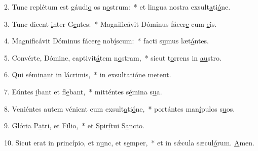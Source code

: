 2. Tunc replétum est gáudi\uline{o} os n\uline{o}strum:~* et lingua nostra exsult\uline{a}ti\uline{ó}ne.\par 
3. Tunc dicent \uline{i}nter G\uline{e}ntes:~* Magnificávit Dóminus fácer\uline{e} cum \uline{e}is.\par 
4. Magnificávit Dóminus fácer\uline{e} nob\uline{í}scum:~* facti s\uline{u}mus læt\uline{á}ntes.\par 
5. Convérte, Dómine, captivit\uline{á}tem n\uline{o}stram,~* sicut t\uline{o}rrens in \uline{au}stro.\par 
6. Qui sémin\uline{a}nt in l\uline{á}crimis,~* in exsultati\uline{ó}ne m\uline{e}tent.\par 
7. Eúntes \uline{i}bant et fl\uline{e}bant,~* mitténtes s\uline{é}mina s\uline{u}a.\par 
8. Veniéntes autem vénient cum exsult\uline{a}ti\uline{ó}ne,~* portántes man\uline{í}pulos s\uline{u}os.\par 
9. Glória P\uline{a}tri, et F\uline{í}lio,~* et Spir\uline{í}tui S\uline{a}ncto.\par 
10. Sicut erat in princípio, et n\uline{u}nc, et s\uline{e}mper,~* et in sǽcula sæcul\uline{ó}rum. \uline{A}men.\par 
